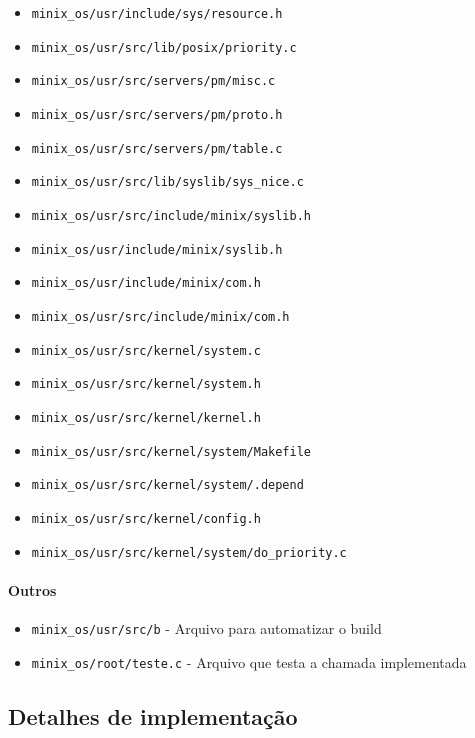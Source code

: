 \documentclass[]{article}
\providecommand{\tightlist}{%
  \setlength{\itemsep}{0pt}\setlength{\parskip}{0pt}}
\let\oldparagraph\paragraph
\renewcommand{\paragraph}[1]{\oldparagraph{#1}\mbox{}}
\begin{document}
\begin{itemize}
\tightlist
\item
  \texttt{minix\_os/usr/include/sys/resource.h}
\item
  \texttt{minix\_os/usr/src/lib/posix/priority.c}
\item
  \texttt{minix\_os/usr/src/servers/pm/misc.c}
\item
  \texttt{minix\_os/usr/src/servers/pm/proto.h}
\item
  \texttt{minix\_os/usr/src/servers/pm/table.c}
\item
  \texttt{minix\_os/usr/src/lib/syslib/sys\_nice.c}
\item
  \texttt{minix\_os/usr/src/include/minix/syslib.h}
\item
  \texttt{minix\_os/usr/include/minix/syslib.h}
\item
  \texttt{minix\_os/usr/include/minix/com.h}
\item
  \texttt{minix\_os/usr/src/include/minix/com.h}
\item
  \texttt{minix\_os/usr/src/kernel/system.c}
\item
  \texttt{minix\_os/usr/src/kernel/system.h}
\item
  \texttt{minix\_os/usr/src/kernel/kernel.h}
\item
  \texttt{minix\_os/usr/src/kernel/system/Makefile}
\item
  \texttt{minix\_os/usr/src/kernel/system/.depend}
\item
  \texttt{minix\_os/usr/src/kernel/config.h}
\item
  \texttt{minix\_os/usr/src/kernel/system/do\_priority.c}
\end{itemize}

\hypertarget{outros}{%
\paragraph{Outros}}

\begin{itemize}
\tightlist
\item
  \texttt{minix\_os/usr/src/b} - Arquivo para automatizar o build
\item
  \texttt{minix\_os/root/teste.c} - Arquivo que testa a chamada
  implementada
\end{itemize}

\hypertarget{detalhes-de-implementauxe7uxe3o}{%
\subsection{Detalhes de
implementação}\label{detalhes-de-implementauxe7uxe3o}}
\end{document}
